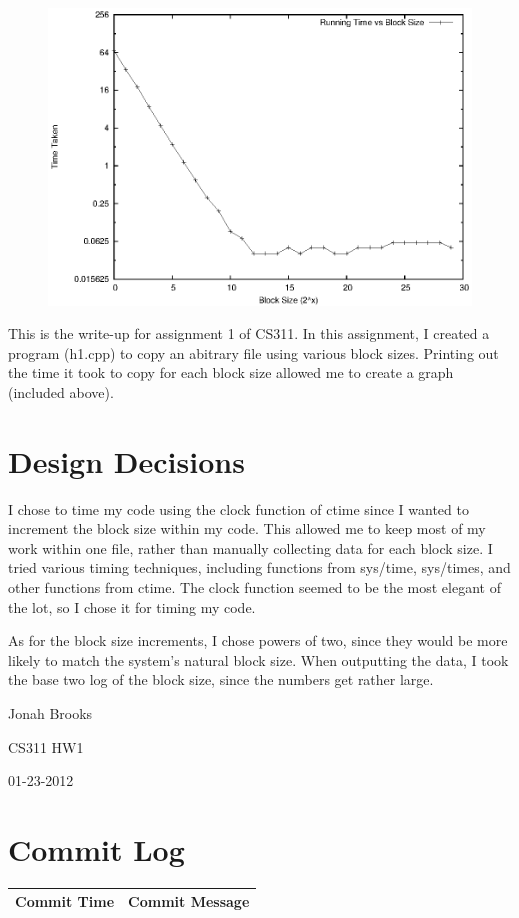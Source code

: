 \documentclass[letterpaper,10pt,twocolumn,titlepage]{article}
\begin{document}
\begin{figure}[h]
\includegraphics{graph.eps}  
\end{figure}

This is the write-up for assignment 1 of CS311. 
In this assignment, I created a program (h1.cpp) to copy an abitrary file using various block sizes. 
Printing out the time it took to copy for each block size allowed me to create a graph (included above).

\section{Design Decisions}
I chose to time my code using the clock function of ctime since I wanted to increment the block size within my code.
This allowed me to keep most of my work within one file, rather than manually collecting data for each block size.
I tried various timing techniques, including functions from sys/time, sys/times, and other functions from ctime.
The clock function seemed to be the most elegant of the lot, so I chose it for timing my code.

As for the block size increments, I chose powers of two, since they would be more likely to match the system's natural block size.
When outputting the data, I took the base two log of the block size, since the numbers get rather large.

\vfill\break

\hfill Jonah Brooks

\hfill CS311 HW1

\hfill 01-23-2012

\vfill\break

\section{Commit Log}
\begin{tabular}{ | p{3cm} | p{5.5cm} | }
	\hline
	Commit Time & Commit Message \\ \hline
	
\end{tabular}
\end{document}
